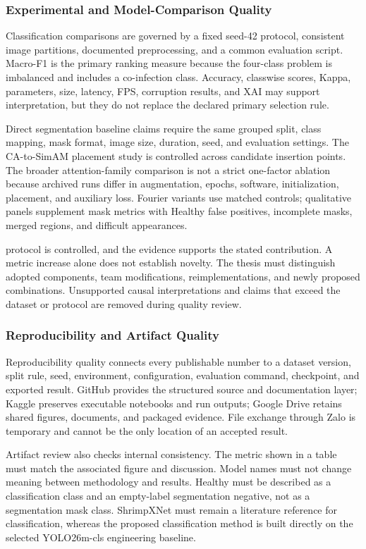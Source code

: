 \documentclass[12pt,a4paper]{report}
\newenvironment{revisionblock}{\begin{snugshade}\noindent}{\end{snugshade}}
\begin{document}
\subsubsection{Experimental and Model-Comparison Quality}
Classification comparisons are governed by a fixed seed-42 protocol, consistent image partitions, documented preprocessing, and a common evaluation script. Macro-F1 is the primary ranking measure because the four-class problem is imbalanced and includes a co-infection class. Accuracy, classwise scores, Kappa, parameters, size, latency, FPS, corruption results, and XAI may support interpretation, but they do not replace the declared primary selection rule.\par
\begin{revisionblock}
Direct segmentation baseline claims require the same grouped split, class mapping, mask format, image size, duration, seed, and evaluation settings. The CA-to-SimAM placement study is controlled across candidate insertion points. The broader attention-family comparison is not a strict one-factor ablation because archived runs differ in augmentation, epochs, software, initialization, placement, and auxiliary loss. Fourier variants use matched controls; qualitative panels supplement mask metrics with Healthy false positives, incomplete masks, merged regions, and difficult appearances.
\end{revisionblock}
protocol is controlled, and the evidence supports the stated contribution. A metric increase alone does not establish novelty. The thesis must distinguish adopted components, team modifications, reimplementations, and newly proposed combinations. Unsupported causal interpretations and claims that exceed the dataset or protocol are removed during quality review.\par
\subsubsection{Reproducibility and Artifact Quality}
Reproducibility quality connects every publishable number to a dataset version, split rule, seed, environment, configuration, evaluation command, checkpoint, and exported result. GitHub provides the structured source and documentation layer; Kaggle preserves executable notebooks and run outputs; Google Drive retains shared figures, documents, and packaged evidence. File exchange through Zalo is temporary and cannot be the only location of an accepted result.\par
Artifact review also checks internal consistency. The metric shown in a table must match the associated figure and discussion. Model names must not change meaning between methodology and results. Healthy must be described as a classification class and an empty-label segmentation negative, not as a segmentation mask class. ShrimpXNet must remain a literature reference for classification, whereas the proposed classification method is built directly on the selected YOLO26m-cls engineering baseline.\par
\end{document}
